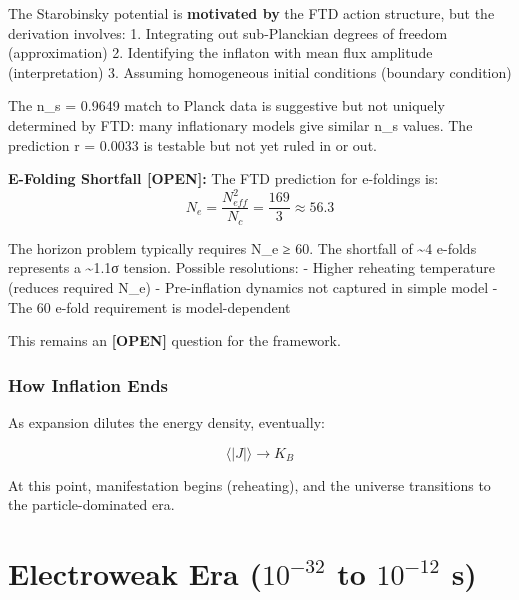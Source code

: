 \documentclass[
  11pt,
  letterpaper,
  twoside,
  openright]{book}
\begin{document}
\begin{tcolorbox}[enhanced jigsaw, coltitle=black, colbacktitle=quarto-callout-warning-color!10!white, toprule=.15mm, colframe=quarto-callout-warning-color-frame, arc=.35mm, opacityback=0, bottomtitle=1mm, toptitle=1mm, breakable, colback=white, titlerule=0mm, opacitybacktitle=0.6, title=\textcolor{quarto-callout-warning-color}{\faExclamationTriangle}\hspace{0.5em}{Epistemic Status: Inflation {[}OPEN ISSUES{]}}, rightrule=.15mm, bottomrule=.15mm, leftrule=.75mm, left=2mm]

The Starobinsky potential is \textbf{motivated by} the FTD action
structure, but the derivation involves: 1. Integrating out sub-Planckian
degrees of freedom (approximation) 2. Identifying the inflaton with mean
flux amplitude (interpretation) 3. Assuming homogeneous initial
conditions (boundary condition)

The n\_s = 0.9649 match to Planck data is suggestive but not uniquely
determined by FTD: many inflationary models give similar n\_s values.
The prediction r = 0.0033 is testable but not yet ruled in or out.

\textbf{E-Folding Shortfall {[}OPEN{]}:} The FTD prediction for
e-foldings is:
\[N_e = \frac{N_{eff}^2}{N_c} = \frac{169}{3} \approx 56.3\]

The horizon problem typically requires N\_e ≥ 60. The shortfall of
\textasciitilde4 e-folds represents a \textasciitilde1.1σ tension.
Possible resolutions: - Higher reheating temperature (reduces required
N\_e) - Pre-inflation dynamics not captured in simple model - The 60
e-fold requirement is model-dependent

This remains an \textbf{{[}OPEN{]}} question for the framework.

\end{tcolorbox}

\subsubsection{How Inflation Ends}\label{how-inflation-ends}

As expansion dilutes the energy density, eventually:

\[\langle |J| \rangle \to K_B\]

At this point, manifestation begins (reheating), and the universe
transitions to the particle-dominated era.

\section{\texorpdfstring{Electroweak Era (\(10^{-32}\) to \(10^{-12}\)
s)}{Electroweak Era (10\^{}\{-32\} to 10\^{}\{-12\} s)}}\label{electroweak-era-10-32-to-10-12-s}
\end{document}
